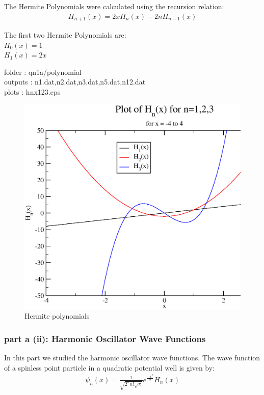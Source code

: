 \documentclass[11pt,a4paper,english]{article}
\newcommand{\beqa}{\begin{eqnarray}}
\newcommand{\eeqa}{\end{eqnarray}}
\begin{document}
The Hermite Polynomials were calculated using the recursion relation:\\
\beqa
H_{n+1}(x)=2xH_{n}(x)-2nH_{n-1}(x)
\eeqa

The first two Hermite Polynomials are:\\
$H_{0}(x)=1$\\
$H_{1}(x)=2x$

    folder       : qn1a/polynomial\\
	outputs      : n1.dat,n2.dat,n3.dat,n5.dat,n12.dat\\
	plots        : hnx123.eps\\
	
	\begin{figure}[h!]
	\centering
	\includegraphics [scale=0.6]{hnx123.eps}
	\caption{Hermite polynomials}
	\end{figure}
	\clearpage

\subsubsection{part a (ii): Harmonic Oscillator Wave Functions}
	
In this part we studied the harmonic oscillator wave functions.
The wave function of a spinless point particle in a quadratic potential well is given by:\\
\beqa
\psi_{n}(x)=\frac{1}{\sqrt{2^{n}n!\sqrt{\pi}}} e^{\frac{-x^{2}}{2}} H_{n}(x)
\eeqa
\end{document}
